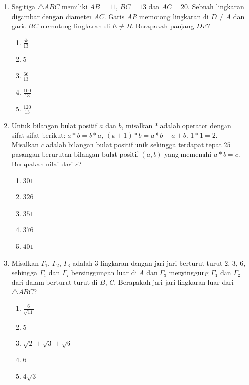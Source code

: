 \documentclass{article}
\begin{document}
\begin{enumerate}
\item Segitiga $\triangle ABC$ memiliki $AB=11$, $BC=13$ dan $AC=20$. Sebuah lingkaran digambar dengan diameter $AC$. Garis $AB$ memotong lingkaran di $D\ne A$ dan garis $BC$ memotong lingkaran di $E\ne B$. Berapakah panjang $DE$?
\begin{enumerate}
    \item $\frac{55}{13}$
    \item $5$
    \item $\frac{66}{13}$
    \item $\frac{100}{13}$
    \item $\frac{120}{13}$
\end{enumerate}

\item Untuk bilangan bulat positif $a$ dan $b$, misalkan $*$ adalah operator dengan sifat-sifat berikut: $a*b=b*a$, $(a+1)*b=a*b+a+b$, $1*1=2$. Misalkan $c$ adalah bilangan bulat positif unik sehingga terdapat tepat $25$ pasangan berurutan bilangan bulat positif $(a, b)$ yang memenuhi $a*b=c$. Berapakah nilai dari $c$?
\begin{enumerate}
    \item $301$
    \item $326$
    \item $351$
    \item $376$
    \item $401$
\end{enumerate}

\item Misalkan $\Gamma_{1}$, $\Gamma_{2}$, $\Gamma_{3}$ adalah $3$ lingkaran dengan jari-jari berturut-turut $2$, $3$, $6$, sehingga $\Gamma_{1}$ dan $\Gamma_{2}$ bersinggungan luar di $A$ dan $\Gamma_{3}$ menyinggung $\Gamma_{1}$ dan $\Gamma_{2}$ dari dalam berturut-turut di $B$, $C$. Berapakah jari-jari lingkaran luar dari $\triangle ABC$?
\begin{enumerate}
    \item $\frac{6}{\sqrt{11}}$
    \item $5$
    \item $\sqrt{2}+\sqrt{3}+\sqrt{6}$
    \item $6$
    \item $4\sqrt{3}$
\end{enumerate}


\end{enumerate}
\end{document}
